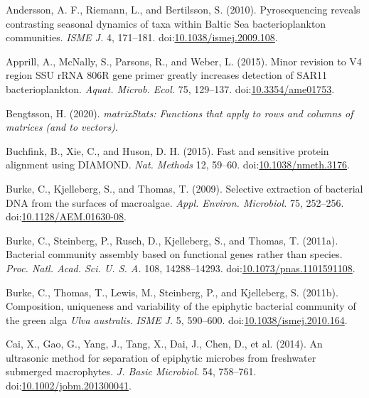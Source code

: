 \documentclass[12pt,]{article}
\begin{document}
\leavevmode\hypertarget{ref-Andersson2010}{}%
Andersson, A. F., Riemann, L., and Bertilsson, S. (2010). Pyrosequencing
reveals contrasting seasonal dynamics of taxa within Baltic Sea
bacterioplankton communities. \emph{ISME J.} 4, 171--181.
doi:\href{https://doi.org/10.1038/ismej.2009.108}{10.1038/ismej.2009.108}.

\leavevmode\hypertarget{ref-Apprill2015}{}%
Apprill, A., McNally, S., Parsons, R., and Weber, L. (2015). Minor
revision to V4 region SSU rRNA 806R gene primer greatly increases
detection of SAR11 bacterioplankton. \emph{Aquat. Microb. Ecol.} 75,
129--137. doi:\href{https://doi.org/10.3354/ame01753}{10.3354/ame01753}.

\leavevmode\hypertarget{ref-Bengtsson2020}{}%
Bengtsson, H. (2020). \emph{matrixStats: Functions that apply to rows
and columns of matrices (and to vectors)}.

\leavevmode\hypertarget{ref-Buchfink2015}{}%
Buchfink, B., Xie, C., and Huson, D. H. (2015). Fast and sensitive
protein alignment using DIAMOND. \emph{Nat. Methods} 12, 59--60.
doi:\href{https://doi.org/10.1038/nmeth.3176}{10.1038/nmeth.3176}.

\leavevmode\hypertarget{ref-Burke2009}{}%
Burke, C., Kjelleberg, S., and Thomas, T. (2009). Selective extraction
of bacterial DNA from the surfaces of macroalgae. \emph{Appl. Environ.
Microbiol.} 75, 252--256.
doi:\href{https://doi.org/10.1128/AEM.01630-08}{10.1128/AEM.01630-08}.

\leavevmode\hypertarget{ref-Burke2011}{}%
Burke, C., Steinberg, P., Rusch, D., Kjelleberg, S., and Thomas, T.
(2011a). Bacterial community assembly based on functional genes rather
than species. \emph{Proc. Natl. Acad. Sci. U. S. A.} 108, 14288--14293.
doi:\href{https://doi.org/10.1073/pnas.1101591108}{10.1073/pnas.1101591108}.

\leavevmode\hypertarget{ref-Burke2011a}{}%
Burke, C., Thomas, T., Lewis, M., Steinberg, P., and Kjelleberg, S.
(2011b). Composition, uniqueness and variability of the epiphytic
bacterial community of the green alga \emph{Ulva australis}. \emph{ISME
J.} 5, 590--600.
doi:\href{https://doi.org/10.1038/ismej.2010.164}{10.1038/ismej.2010.164}.

\leavevmode\hypertarget{ref-Cai2014}{}%
Cai, X., Gao, G., Yang, J., Tang, X., Dai, J., Chen, D., et al. (2014).
An ultrasonic method for separation of epiphytic microbes from
freshwater submerged macrophytes. \emph{J. Basic Microbiol.} 54,
758--761.
doi:\href{https://doi.org/10.1002/jobm.201300041}{10.1002/jobm.201300041}.
\end{document}
